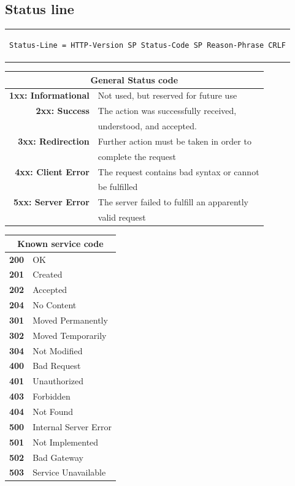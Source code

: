\subsection{Status line}
\begin{center}
\begin{tabular}{c}
\begin{lstlisting}[linewidth=330pt, basicstyle=\footnotesize\sffamily,]
Status-Line = HTTP-Version SP Status-Code SP Reason-Phrase CRLF
\end{lstlisting}
\end{tabular}
\end{center}
\begin{table}[h]
\centering
\footnotesize
\begin{tabular}{|r|l|}
\multicolumn{2}{c}{\textbf{General Status code}}\\
\hline
\textbf{1xx: Informational} & {Not used, but reserved for future use}\\
\hline
\textbf{2xx: Success}&{The action was successfully received,}\\
\hline
& {understood, and accepted.}\\
\hline
\textbf{3xx: Redirection} & {Further action must be taken in order to}\\
&{complete the request}\\
\hline
\textbf{4xx: Client Error}&{The request contains bad syntax or cannot}\\
&{be fulfilled}\\
\hline
\textbf{5xx: Server Error}&{The server failed to fulfill an apparently}\\
&{valid request}\\
\hline
\end{tabular}
\end{table}
\begin{table}[h]
\centering
\footnotesize
\begin{tabular}{|r|l|}
\multicolumn{2}{c}{\textbf{Known service code}}\\
\hline
\textbf{200}&{OK}\\
\hline
\textbf{201}&{Created}\\
\hline
\textbf{202}&{Accepted}\\
\hline
\textbf{204}&{No Content}\\
\hline
\textbf{301}&{Moved Permanently}\\
\hline
\textbf{302}&{Moved Temporarily}\\
\hline
\textbf{304}&{Not Modified}\\
\hline
\textbf{400}&{Bad Request}\\
\hline
\textbf{401}&{Unauthorized}\\
\hline
\textbf{403}&{Forbidden}\\
\hline
\textbf{404}&{Not Found}\\
\hline
\textbf{500}&{Internal Server Error}\\
\hline
\textbf{501}&{Not Implemented}\\
\hline
\textbf{502}&{Bad Gateway}\\
\hline
\textbf{503}&{Service Unavailable}\\
\hline
\end{tabular}
\end{table}

